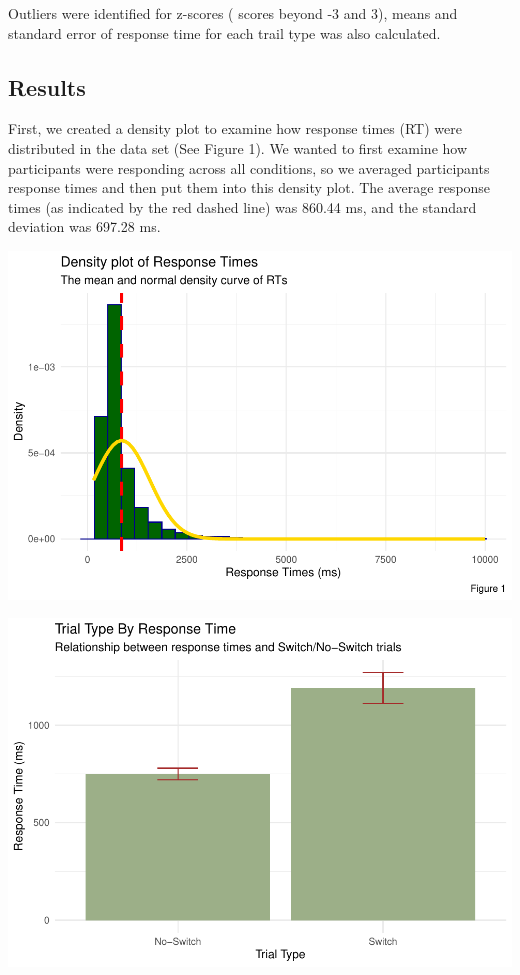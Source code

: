 \documentclass[
  11pt,
]{article}
\begin{document}
Outliers were identified for z-scores ( scores beyond -3 and 3), means
and standard error of response time for each trail type was also
calculated.

\subsection{Results}\label{results}

First, we created a density plot to examine how response times (RT) were
distributed in the data set (See Figure 1). We wanted to first examine
how participants were responding across all conditions, so we averaged
participants response times and then put them into this density plot.
The average response times (as indicated by the red dashed line) was
860.44 ms, and the standard deviation was 697.28 ms.

\includegraphics{final-paper-EDLD_files/figure-latex/unnamed-chunk-3-1.pdf}

\includegraphics{final-paper-EDLD_files/figure-latex/unnamed-chunk-4-1.pdf}
\end{document}
